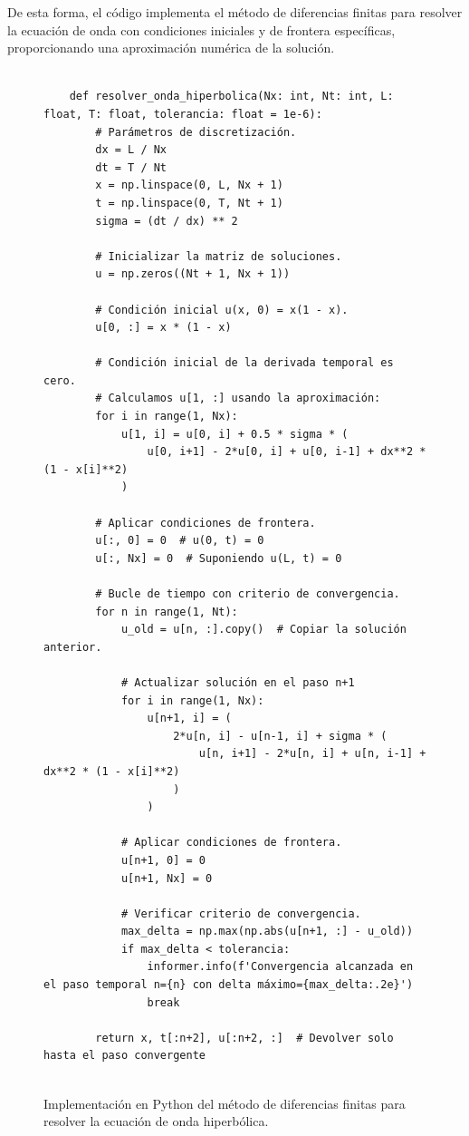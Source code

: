 De esta forma, el código implementa el método de diferencias finitas para resolver la ecuación de onda con condiciones iniciales y de frontera específicas, proporcionando una aproximación numérica de la solución.

\begin{figure}[h!]
    \centering
    \begin{verbatim}
    
    def resolver_onda_hiperbolica(Nx: int, Nt: int, L: float, T: float, tolerancia: float = 1e-6):
        # Parámetros de discretización.
        dx = L / Nx
        dt = T / Nt
        x = np.linspace(0, L, Nx + 1)
        t = np.linspace(0, T, Nt + 1)
        sigma = (dt / dx) ** 2
    
        # Inicializar la matriz de soluciones.
        u = np.zeros((Nt + 1, Nx + 1))
    
        # Condición inicial u(x, 0) = x(1 - x).
        u[0, :] = x * (1 - x)
    
        # Condición inicial de la derivada temporal es cero.
        # Calculamos u[1, :] usando la aproximación:
        for i in range(1, Nx):
            u[1, i] = u[0, i] + 0.5 * sigma * (
                u[0, i+1] - 2*u[0, i] + u[0, i-1] + dx**2 * (1 - x[i]**2)
            )
    
        # Aplicar condiciones de frontera.
        u[:, 0] = 0  # u(0, t) = 0
        u[:, Nx] = 0  # Suponiendo u(L, t) = 0
    
        # Bucle de tiempo con criterio de convergencia.
        for n in range(1, Nt):
            u_old = u[n, :].copy()  # Copiar la solución anterior.
    
            # Actualizar solución en el paso n+1
            for i in range(1, Nx):
                u[n+1, i] = (
                    2*u[n, i] - u[n-1, i] + sigma * (
                        u[n, i+1] - 2*u[n, i] + u[n, i-1] + dx**2 * (1 - x[i]**2)
                    )
                )
    
            # Aplicar condiciones de frontera.
            u[n+1, 0] = 0
            u[n+1, Nx] = 0
    
            # Verificar criterio de convergencia.
            max_delta = np.max(np.abs(u[n+1, :] - u_old))
            if max_delta < tolerancia:
                informer.info(f'Convergencia alcanzada en el paso temporal n={n} con delta máximo={max_delta:.2e}')
                break
    
        return x, t[:n+2], u[:n+2, :]  # Devolver solo hasta el paso convergente
    
    \end{verbatim}
    \label{fig:codigo_dif_finitas}
    \caption{Implementación en Python del método de diferencias finitas para resolver la ecuación de onda hiperbólica.}
\end{figure}

